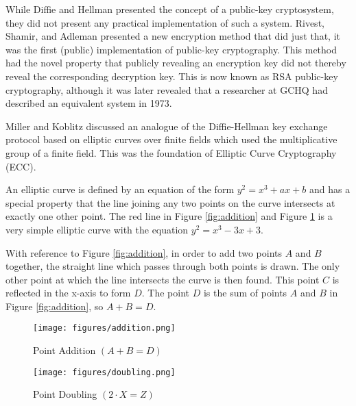 \documentclass[12pt,a4paper]{article}
\begin{document}
While Diffie and Hellman presented the concept of a public-key cryptosystem, they did not present any practical implementation of such a system. 
Rivest, Shamir, and Adleman \citeyear{10.1145/359340.359342} presented a new encryption method that did just that, 
it was the first (public) implementation of public-key cryptography. 
This method had the novel property that publicly revealing an encryption key did not thereby reveal the corresponding decryption key. 
This is now known as RSA public-key cryptography, 
although it was later revealed that a researcher at GCHQ had described an equivalent system in 1973. 

Miller \citeyear{10.1007/3-540-39799-X_31} and Koblitz \citeyear{koblitz1987elliptic} discussed an analogue of the 
Diffie-Hellman key exchange protocol based on elliptic curves over finite fields which used the multiplicative group of a finite field. 
This was the foundation of Elliptic Curve Cryptography (ECC). 

An elliptic curve is defined by an equation of the form $y^2 = x^3 + ax + b$ 
and has a special property that the line joining any two points on the curve intersects at exactly one other point. 
The red line in Figure \ref{fig:addition} and Figure \ref{fig:doubling} is a very simple elliptic curve with the equation $y^2 = x^3 - 3x + 3$. 

With reference to Figure \ref{fig:addition}, in order to add two points $A$ and $B$ together, 
the straight line which passes through both points is drawn. 
The only other point at which the line intersects the curve is then found. 
This point $C$ is reflected in the x-axis to form $D$. 
The point $D$ is the sum of points $A$ and $B$ in Figure \ref{fig:addition}, so $A + B = D$. 

\begin{figure}[!htb]
    \begin{minipage}{0.48\textwidth}
        \centering
        \texttt{[image: figures/addition.png]}
        \caption{Point Addition $(A + B = D)$}
        \label{fig:addition}
    \end{minipage}\hfill
    \begin{minipage}{0.48\textwidth}
        \centering
        \texttt{[image: figures/doubling.png]}
        \caption{Point Doubling $(2 \cdot X = Z)$}
        \label{fig:doubling}
    \end{minipage}
\end{figure}
\end{document}
